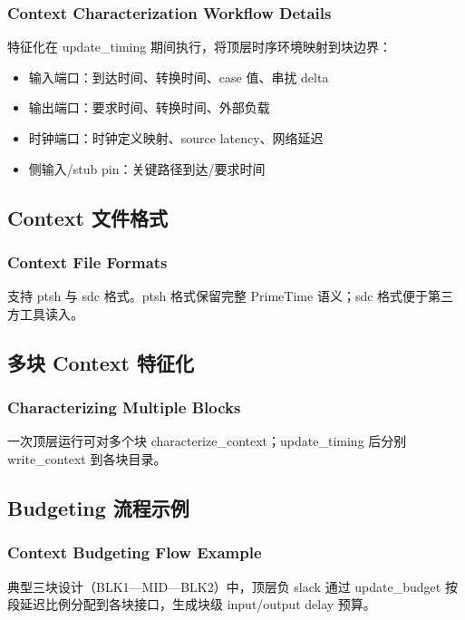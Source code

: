 \subsubsection*{Context Characterization Workflow Details}

特征化在 update_timing 期间执行，将顶层时序环境映射到块边界：
\begin{itemize}
  \item 输入端口：到达时间、转换时间、case 值、串扰 delta
  \item 输出端口：要求时间、转换时间、外部负载
  \item 时钟端口：时钟定义映射、source latency、网络延迟
  \item 侧输入/stub pin：关键路径到达/要求时间
\end{itemize}

\subsection{Context 文件格式}
\subsubsection*{Context File Formats}

 支持 ptsh 与 sdc 格式。ptsh 格式保留完整 PrimeTime 语义；sdc 格式便于第三方工具读入。

\subsection{多块 Context 特征化}
\subsubsection*{Characterizing Multiple Blocks}

一次顶层运行可对多个块 characterize_context；update_timing 后分别 write_context 到各块目录。

\subsection{Budgeting 流程示例}
\subsubsection*{Context Budgeting Flow Example}

典型三块设计（BLK1—MID—BLK2）中，顶层负 slack 通过 update_budget 按段延迟比例分配到各块接口，生成块级 input/output delay 预算。

